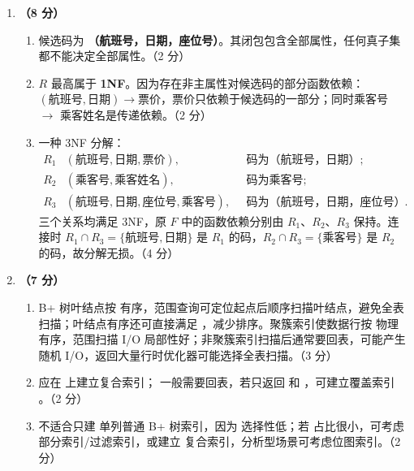 \documentclass[a4paper,11pt]{article}
\begin{document}
\begin{enumerate}[start=21, label=\textbf{\arabic*.}, leftmargin=2.4em, itemsep=0.45em]
\item \textbf{（8 分）}
\begin{enumerate}[label=（\arabic*）, leftmargin=2.2em, itemsep=2pt]
  \item 候选码为 \textbf{（航班号，日期，座位号）}。其闭包包含全部属性，任何真子集都不能决定全部属性。\hfill（2 分）
  \item $R$ 最高属于 \textbf{1NF}。因为存在非主属性对候选码的部分函数依赖：$(\text{航班号},\text{日期})\to\text{票价}$，票价只依赖于候选码的一部分；同时乘客号 $\to$ 乘客姓名是传递依赖。\hfill（2 分）
  \item 一种 3NF 分解：
  \[
  \begin{aligned}
  R_1&(\text{航班号},\text{日期},\text{票价}), &&\text{码为（航班号，日期）};\\
  R_2&(\text{乘客号},\text{乘客姓名}), &&\text{码为乘客号};\\
  R_3&(\text{航班号},\text{日期},\text{座位号},\text{乘客号}), &&\text{码为（航班号，日期，座位号）}.
  \end{aligned}
  \]
  三个关系均满足 3NF，原 $F$ 中的函数依赖分别由 $R_1$、$R_2$、$R_3$ 保持。连接时 $R_1\cap R_3=\{\text{航班号},\text{日期}\}$ 是 $R_1$ 的码，$R_2\cap R_3=\{\text{乘客号}\}$ 是 $R_2$ 的码，故分解无损。\hfill（4 分）
\end{enumerate}

\item \textbf{（7 分）}
\begin{enumerate}[label=（\arabic*）, leftmargin=2.2em, itemsep=2pt]
  \item B+ 树叶结点按  有序，范围查询可定位起点后顺序扫描叶结点，避免全表扫描；叶结点有序还可直接满足 ，减少排序。聚簇索引使数据行按  物理有序，范围扫描 I/O 局部性好；非聚簇索引扫描后通常要回表，可能产生随机 I/O，返回大量行时优化器可能选择全表扫描。\hfill（3 分）
  \item 应在  上建立复合索引； 一般需要回表，若只返回  和 ，可建立覆盖索引 。\hfill（2 分）
  \item 不适合只建  单列普通 B+ 树索引，因为  选择性低；若  占比很小，可考虑部分索引/过滤索引，或建立  复合索引，分析型场景可考虑位图索引。\hfill（2 分）
\end{enumerate}

\end{enumerate}
\end{document}
